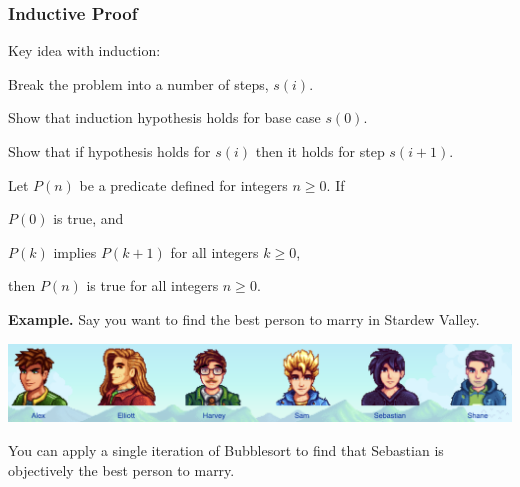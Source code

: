 \subsubsection{Inductive Proof}

Key idea with induction:

\begin{listu}
    \item Break the problem into a number of steps, $s(i)$. 
    \item Show that induction hypothesis holds for base case $s(0)$. 
    \item Show that if hypothesis holds for $s(i)$ then it holds for step $s(i+1)$.
\end{listu}

\begin{theorem}
    Let $P(n)$ be a predicate defined for integers $n \geq 0$. If
    \begin{listo}
        \item $P(0)$ is true, and
        \item $P(k)$ implies $P(k+1)$ for all integers $k \geq 0$,
    \end{listo}
    then $P(n)$ is true for all integers $n \geq 0$.
\end{theorem}

\textbf{\color{primary}Example.}
    Say you want to find the best person to marry in Stardew Valley. 

    \begin{center}
        \includegraphics[width=0.75\linewidth]{figures/Stardew Valley.png}
    \end{center}

    You can apply a single iteration of Bubblesort to find that Sebastian is objectively the best person to marry. 

    \begin{algorithm}
        \begin{algorithmic}[1]
                            \State {}
                        \EndIf
                    \EndFor
                \EndFor
            \EndFunction
        \end{algorithmic}
    \end{algorithm}

